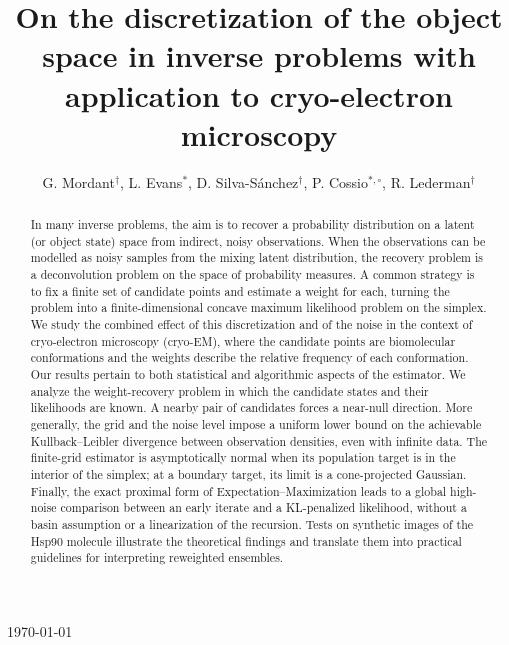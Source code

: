 \documentclass[12pt]{iopart}
\theoremstyle{remark}
\begin{document}
\title[]{On the discretization of the object space in inverse problems with application to cryo-electron microscopy}

\author{G. Mordant$^\dagger$, L. Evans$^{*}$, D. Silva-S{\'a}nchez$^{\dagger}$, P. Cossio$^{*,\circ}$, R. Lederman$^{\dagger}$ }

\address{
$^{*}$ Center for Computational Mathematics, Flatiron Institute, New York, United States \\
$^{\circ}$ Center for Computational Biology, Flatiron Institute, New York, United States \\
$^{\dagger}$ Yale University, CT, USA}
\vspace{10pt}
\begin{indented}
\item[]\today
\end{indented}


\begin{abstract}

In many inverse problems, the aim is to recover a probability distribution
on a latent (or object state) space from indirect, noisy observations. When the observations
can be modelled as noisy samples from the mixing latent distribution, the recovery
problem is a deconvolution problem on the space of probability measures.
A common strategy is to fix a finite set of candidate points and estimate
a weight for each, turning the problem into a finite-dimensional concave
maximum likelihood problem on the simplex. We study the combined effect of
this discretization and of the noise in the context of cryo-electron
microscopy (cryo-EM), where the candidate points are biomolecular conformations
and the weights describe the
relative frequency of each conformation.
Our results pertain to both statistical and algorithmic aspects of the estimator.
We analyze the weight-recovery problem in which the candidate states and
their likelihoods are known. A nearby pair of candidates forces a
near-null direction. More generally, the grid and the noise level impose
a uniform lower bound on the achievable Kullback--Leibler divergence
between observation densities, even with infinite data. The finite-grid
estimator is asymptotically normal when its population target is in the
interior of the simplex; at a boundary target, its limit is a cone-projected
Gaussian. Finally, the exact proximal form of Expectation--Maximization leads
to a global high-noise comparison between an early iterate and a
KL-penalized likelihood, without a basin assumption or a linearization of the
recursion. Tests on synthetic images of the Hsp90 molecule illustrate
the theoretical findings and translate them into practical guidelines for
interpreting reweighted ensembles.

\end{abstract}
\end{document}
